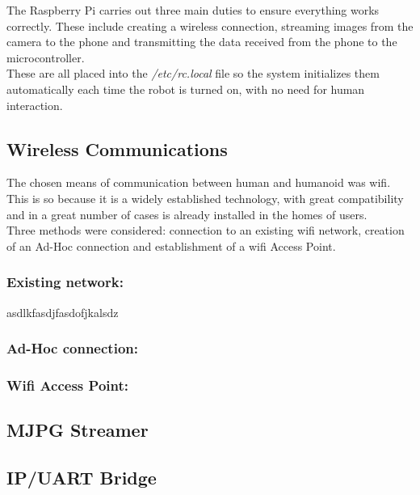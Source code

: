 The Raspberry Pi carries out three main duties to ensure everything works correctly. These include creating a wireless connection, streaming images from the camera to the phone and transmitting the data received from the phone to the microcontroller.\\

 These are all placed into the \textit{/etc/rc.local} file so the system initializes them automatically each time the robot is turned on, with no need for human interaction.

\subsection{Wireless Communications}%

The chosen means of communication between human and humanoid was wifi. This is so because it is a widely established technology, with great compatibility and in a great number of cases is already installed in the homes of users.\\

Three methods were considered: connection to an existing wifi network, creation of an Ad-Hoc connection and establishment of a wifi Access Point.

\subsubsection{Existing network:}

asdlkfasdjfasdofjkalsdz

\subsubsection{Ad-Hoc connection:}



\subsubsection{Wifi Access Point:}




\subsection{MJPG Streamer}




\subsection{IP/UART Bridge} 
